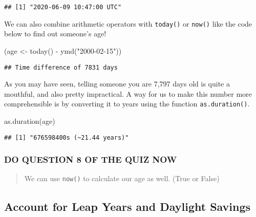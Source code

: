 \documentclass[
]{book}
\newenvironment{Shaded}{\begin{snugshade}}{\end{snugshade}}
\newcommand{\FunctionTok}[1]{\textcolor[rgb]{0.00,0.00,0.00}{#1}}
\newcommand{\NormalTok}[1]{#1}
\newcommand{\OtherTok}[1]{\textcolor[rgb]{0.56,0.35,0.01}{#1}}
\newcommand{\SpecialCharTok}[1]{\textcolor[rgb]{0.00,0.00,0.00}{#1}}
\newcommand{\StringTok}[1]{\textcolor[rgb]{0.31,0.60,0.02}{#1}}
\begin{document}
\begin{verbatim}
## [1] "2020-06-09 10:47:00 UTC"
\end{verbatim}

We can also combine arithmetic operators with \texttt{today()} or \texttt{now()} like the code below to find out someone's age!

\begin{Shaded}
\begin{Highlighting}[]
\NormalTok{(age }\OtherTok{\textless{}{-}} \FunctionTok{today}\NormalTok{() }\SpecialCharTok{{-}} \FunctionTok{ymd}\NormalTok{(}\StringTok{"2000{-}02{-}15"}\NormalTok{))}
\end{Highlighting}
\end{Shaded}

\begin{verbatim}
## Time difference of 7831 days
\end{verbatim}

As you may have seen, telling someone you are 7,797 days old is quite a mouthful, and also pretty impractical. A way for us to make this number more comprehensible is by converting it to years using the function \texttt{as.duration()}.

\begin{Shaded}
\begin{Highlighting}[]
\FunctionTok{as.duration}\NormalTok{(age)}
\end{Highlighting}
\end{Shaded}

\begin{verbatim}
## [1] "676598400s (~21.44 years)"
\end{verbatim}

\hypertarget{do-question-8-of-the-quiz-now-2}{%
\subsubsection{DO QUESTION 8 OF THE QUIZ NOW}\label{do-question-8-of-the-quiz-now-2}}

\begin{quote}
We can use \texttt{now()} to calculate our age as well. (True or False)
\end{quote}

\hypertarget{account-for-leap-years-and-daylight-savings}{%
\subsection{Account for Leap Years and Daylight Savings}\label{account-for-leap-years-and-daylight-savings}}
\end{document}
